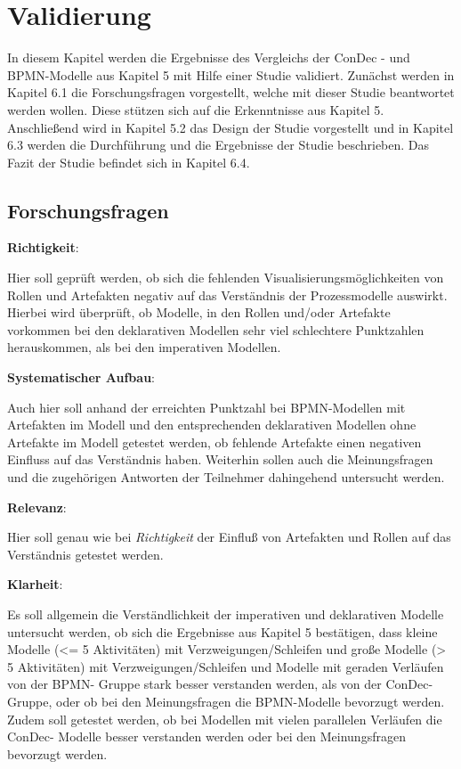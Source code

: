 \chapter{Validierung}\label{sec:chapter7}

In diesem Kapitel werden die Ergebnisse des Vergleichs der ConDec - und BPMN-Modelle aus Kapitel 5 mit Hilfe einer Studie validiert. Zunächst werden in Kapitel 6.1 die Forschungsfragen vorgestellt, welche mit dieser Studie beantwortet werden wollen. Diese stützen sich auf die Erkenntnisse aus Kapitel 5. Anschließend wird in Kapitel 5.2 das Design der Studie vorgestellt und in Kapitel 6.3 werden die Durchführung und die Ergebnisse der Studie beschrieben. Das Fazit der Studie befindet sich in Kapitel 6.4. \newline


\section{Forschungsfragen}

\textbf{Richtigkeit}: 


Hier soll geprüft werden, ob sich die fehlenden Visualisierungsmöglichkeiten von Rollen und Artefakten negativ auf das Verständnis der Prozessmodelle auswirkt. Hierbei wird überprüft, ob Modelle, in den Rollen und/oder Artefakte vorkommen bei den deklarativen Modellen sehr viel schlechtere Punktzahlen herauskommen, als bei den imperativen Modellen.\newline


\textbf{Systematischer Aufbau}: 


Auch hier soll anhand der erreichten Punktzahl bei BPMN-Modellen mit Artefakten im Modell und den entsprechenden deklarativen Modellen ohne Artefakte im Modell getestet werden, ob fehlende Artefakte einen negativen Einfluss auf das Verständnis haben. Weiterhin sollen auch die Meinungsfragen und die zugehörigen Antworten der Teilnehmer dahingehend untersucht werden.\newline

\textbf{Relevanz}: 

Hier soll genau wie bei \textit{Richtigkeit} der Einfluß von Artefakten und Rollen auf das Verständnis getestet werden.


\textbf{Klarheit}: 

Es soll allgemein die Verständlichkeit der imperativen und deklarativen Modelle untersucht werden, ob sich die Ergebnisse aus Kapitel 5 bestätigen, dass kleine Modelle (<= 5 Aktivitäten) mit Verzweigungen/Schleifen und große Modelle (> 5 Aktivitäten) mit Verzweigungen/Schleifen und Modelle mit geraden Verläufen von der BPMN- Gruppe stark besser verstanden werden, als von der ConDec- Gruppe, oder ob bei den Meinungsfragen die BPMN-Modelle bevorzugt werden. \newline
Zudem soll getestet werden, ob bei Modellen mit vielen parallelen Verläufen die ConDec- Modelle besser verstanden werden oder bei den Meinungsfragen bevorzugt werden.

